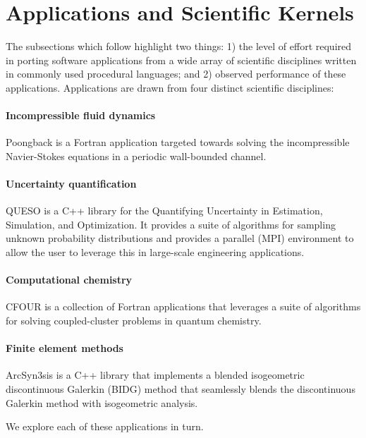 \section{Applications and Scientific Kernels}
\label{sec:apps}

The subsections which follow highlight two things: 1) the level of effort
required in porting software applications from a wide array of scientific
disciplines written in commonly used procedural languages; and 2) observed
performance of these applications.  Applications are drawn from four distinct
scientific disciplines:

\paragraph{Incompressible fluid dynamics}  Poongback is a Fortran application
targeted towards solving the incompressible Navier-Stokes equations in a
periodic wall-bounded channel.

\paragraph{Uncertainty quantification}  QUESO is a C++ library for the
Quantifying Uncertainty in Estimation, Simulation, and Optimization.  It
provides a suite of algorithms for sampling unknown probability distributions
and provides a parallel (MPI) environment to allow the user to leverage this in
large-scale engineering applications.

\paragraph{Computational chemistry}  CFOUR is a collection of Fortran
applications that leverages a suite of algorithms for solving coupled-cluster
problems in quantum chemistry.

\paragraph{Finite element methods}  ArcSyn3sis is a C++ library that implements
a blended isogeometric discontinuous Galerkin (BIDG) method that seamlessly
blends the discontinuous Galerkin method with isogeometric analysis.

We explore each of these applications in turn.
